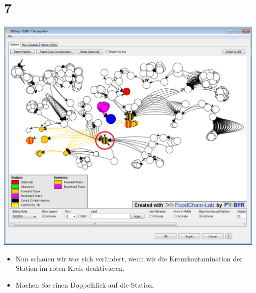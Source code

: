 \documentclass{beamer}
\begin{document}
\section{7}
\begin{frame}
	\begin{center}
  		\includegraphics[height=0.6\textheight]{7.png}
	\end{center}
	\begin{itemize}
		\item Nun schauen wir was sich verändert, wenn wir die Kreuzkontamination der Station im roten Kreis deaktivieren.
		\item Machen Sie einen Doppelklick auf die Station.
	\end{itemize}
\end{frame}
\end{document}
